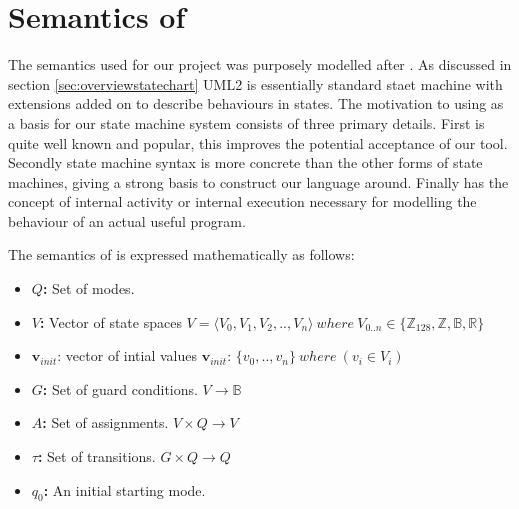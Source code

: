 \section{Semantics of \plcchart}
\label{sec:statechartsem}

The semantics used for our project was purposely modelled after \cite{UML2}. As discussed in section \ref{sec:overviewstatechart} UML2 is essentially standard staet machine with extensions added on to describe behaviours in states. The motivation to using \cite{UML2} as a basis for our state machine system consists of three primary details. First \cite{UML2} is quite well known and popular, this improves the potential acceptance of our tool. Secondly \cite{UML2} state machine syntax is more concrete than the other forms of state machines, giving a strong basis to construct our language around. Finally \cite{UML2} has the concept of internal activity or internal execution necessary for modelling the behaviour of an actual useful program.

The semantics of \plcchart is expressed mathematically as follows:

\begin{definition}
	\plcchart
	
\begin{itemize}
	\item \textbf{$Q$:} Set of modes.
	\item \textbf{$V$:} Vector of state spaces $V = \langle V_0,V_1,V_2,..,V_n \rangle \: where \: V_{0..n}\in \lbrace \mathbb{Z}_{128}, \mathbb{Z}, \mathbb{B}, \mathbb{R} \rbrace$
	\item $\mathbf{v}_{init}$: vector of intial values $\mathbf{v}_{init}$: $\lbrace v_0,..,v_n \rbrace \: where \: (v_i \in V_i)$
	\item \textbf{$G$:} Set of guard conditions. $V \rightarrow \mathbb{B}$
	\item \textbf{$A$:} Set of assignments. $V \times Q \rightarrow V$
	\item \textbf{$\tau$:} Set of transitions. $G \times Q \rightarrow Q$
	\item \textbf{$q_0$:} An initial starting mode.
\end{itemize}
\end{definition}

